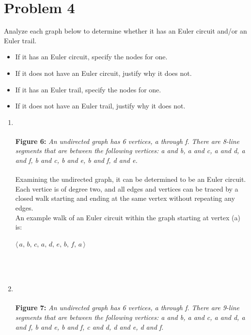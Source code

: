 \documentclass{amsart}
\theoremstyle{definition}
\theoremstyle{Exercise}
\theoremstyle{remark}
\theoremstyle{rule}
\numberwithin{equation}{section}
\begin{document}
  \section*{Problem 4}
 Analyze each graph below to determine whether it has an Euler circuit and/or an Euler trail.
 \begin{itemize}
     \item If it has an Euler circuit, specify the nodes for one.
     \item If it does not have an Euler circuit, justify why it does not.
     \item If it has an Euler trail, specify the nodes for one.
     \item If it does not have an Euler trail, justify why it does not.
 \end{itemize}
  \begin{enumerate}[label=(\alph*)]
\item 
{}
\\\\
{\color{blue} {\bf Figure 6:} \emph{An undirected graph has 6 vertices, a through f. There are 8-line segments that are between the following vertices: a and b, a and c, a and d, a and f, b and c, b and e, b and f, d and e. 
  }
}\\\\
Examining the undirected graph, it can be determined to be an Euler circuit. Each vertice is of degree two, and all edges and vertices can be traced by a 
closed walk starting and ending at the same vertex without repeating any edges.\\
An example walk of an Euler circuit within the graph starting at vertex (a) is:\\\\
$\langle\,a,\, b,\, c,\, a,\, d,\, e,\, b,\, f,\, a\, \rangle$
\\\\
   \newpage
~\\~\\
\item
{}
\\\\
{\color{blue} {\bf Figure 7:} \emph{
An undirected graph has 6 vertices, a through f. There are 9-line segments that are between the following vertices: a and b, a and c, a and d, a and f, b and e, b and f, c and d, d and e, d and f. }
}
\\\\

\end{enumerate}
\end{document}
